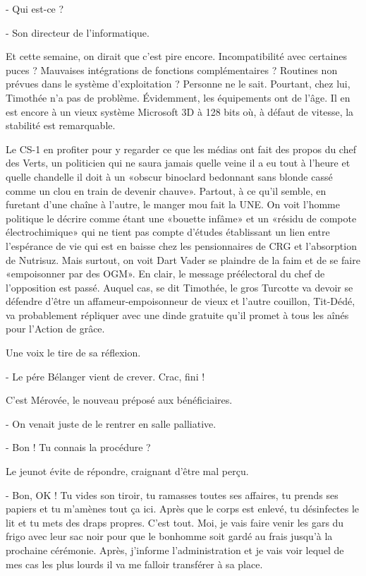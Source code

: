 - Qui est-ce ?

- Son directeur de l’informatique.

Et cette semaine, on dirait que c’est pire encore. Incompatibilité avec certaines puces ? Mauvaises intégrations de fonctions complémentaires ? Routines non prévues dans le système d’exploitation ? Personne ne le sait. Pourtant, chez lui, Timothée n’a pas de problème. Évidemment, les équipements ont de l’âge. Il en est encore à un vieux système Microsoft 3D à 128 bits où, à défaut de vitesse, la stabilité est remarquable.

Le CS-1 en profiter pour y regarder ce que les médias ont fait des propos du chef des Verts, un politicien qui ne saura jamais quelle veine il a eu tout à l’heure et quelle chandelle il doit à un «obscur binoclard bedonnant sans blonde cassé comme un clou en train de devenir chauve». Partout, à ce qu’il semble, en furetant d’une chaîne à l’autre, le manger mou fait la UNE. On voit l’homme politique le décrire comme étant une «bouette infâme» et un «résidu de compote électrochimique» qui ne tient pas compte d’études établissant un lien entre l’espérance de vie qui est en baisse chez les pensionnaires de CRG et l’absorption de Nutrisuz. Mais surtout, on voit Dart Vader se plaindre de la faim et de se faire «empoisonner par des OGM». En clair, le message préélectoral du chef de l’opposition est passé. Auquel cas, se dit Timothée, le gros Turcotte va devoir se défendre d’être un affameur-empoisonneur de vieux et l’autre couillon, Tit-Dédé, va probablement répliquer avec une dinde gratuite qu’il promet à tous les aînés pour l’Action de grâce.

Une voix le tire de sa réflexion.

- Le pére Bélanger vient de crever. Crac, fini !

C’est Mérovée, le nouveau préposé aux bénéficiaires.

- On venait juste de le rentrer en salle palliative.

- Bon ! Tu connais la procédure ?

Le jeunot évite de répondre, craignant d’être mal perçu.

- Bon, OK ! Tu vides son tiroir, tu ramasses toutes ses affaires, tu prends ses papiers et tu m’amènes tout ça ici. Après que le corps est enlevé, tu désinfectes le lit et tu mets des draps propres. C’est tout. Moi, je vais faire venir les gars du frigo avec leur sac noir pour que le bonhomme soit gardé au frais jusqu’à la prochaine cérémonie. Après, j’informe l’administration et je vais voir lequel de mes cas les plus lourds il va me falloir transférer à sa place.

